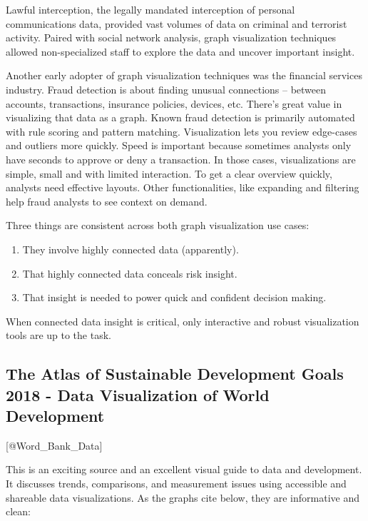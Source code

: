 \documentclass[]{book}
\providecommand{\tightlist}{%
  \setlength{\itemsep}{0pt}\setlength{\parskip}{0pt}}
\theoremstyle{definition}
\theoremstyle{definition}
\theoremstyle{definition}
\theoremstyle{remark}
\begin{document}
Lawful interception, the legally mandated interception of personal
communications data, provided vast volumes of data on criminal and
terrorist activity. Paired with social network analysis, graph
visualization techniques allowed non-specialized staff to explore the
data and uncover important insight.

Another early adopter of graph visualization techniques was the
financial services industry. Fraud detection is about finding unusual
connections -- between accounts, transactions, insurance policies,
devices, etc. There's great value in visualizing that data as a graph.
Known fraud detection is primarily automated with rule scoring and
pattern matching. Visualization lets you review edge-cases and outliers
more quickly. Speed is important because sometimes analysts only have
seconds to approve or deny a transaction. In those cases, visualizations
are simple, small and with limited interaction. To get a clear overview
quickly, analysts need effective layouts. Other functionalities, like
expanding and filtering help fraud analysts to see context on demand.

Three things are consistent across both graph visualization use cases:

\begin{enumerate}
\def\labelenumi{\arabic{enumi}.}
\tightlist
\item
  They involve highly connected data (apparently).
\item
  That highly connected data conceals risk insight.
\item
  That insight is needed to power quick and confident decision making.
\end{enumerate}

When connected data insight is critical, only interactive and robust
visualization tools are up to the task.

\subsection{The Atlas of Sustainable Development Goals 2018 - Data
Visualization of World
Development}\label{the-atlas-of-sustainable-development-goals-2018---data-visualization-of-world-development}

{[}@Word\_Bank\_Data{]}

This is an exciting source and an excellent visual guide to data and
development. It discusses trends, comparisons, and measurement issues
using accessible and shareable data visualizations. As the graphs cite
below, they are informative and clean:
\end{document}
